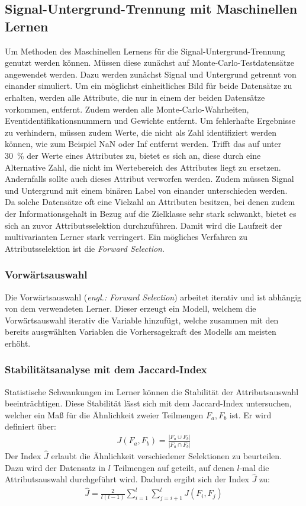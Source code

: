 \subsection{Signal-Untergrund-Trennung mit Maschinellen Lernen}
\label{Signal}
Um Methoden des Maschinellen Lernens für die Signal-Untergrund-Trennung genutzt werden können. Müssen diese zunächst auf Monte-Carlo-Testdatensätze angewendet werden. Dazu werden zunächst Signal und Untergrund getrennt von einander simuliert. Um ein möglichst einheitliches Bild für beide Datensätze zu erhalten, werden alle Attribute, die nur in einem der beiden Datensätze vorkommen, entfernt. Zudem werden alle Monte-Carlo-Wahrheiten, Eventidentifikationsnummern und Gewichte entfernt. Um fehlerhafte Ergebnisse zu verhindern, müssen zudem Werte, die nicht als Zahl identifiziert werden können, wie zum Beispiel NaN oder Inf entfernt werden. Trifft das auf unter \SI{30}{\percent} der Werte eines Attributes zu, bietet es sich an, diese durch eine Alternative Zahl, die nicht im Wertebereich des Attributes liegt zu ersetzen. Andernfalls sollte auch dieses Attribut verworfen werden. Zudem müssen Signal und Untergrund mit einem binären Label von einander unterschieden werden.\\
Da solche Datensätze oft eine Vielzahl an Attributen besitzen, bei denen zudem der Informationsgehalt in Bezug auf die Zielklasse sehr stark schwankt, bietet es sich an zuvor Attributsselektion durchzuführen. Damit wird die Laufzeit der multivarianten Lerner stark verringert. Ein mögliches Verfahren zu Attributsselektion ist die \textit{Forward Selection}.
\subsubsection{Vorwärtsauswahl}
Die Vorwärtsauswahl (\textit{engl.: Forward Selection}) arbeitet iterativ und ist abhängig von dem verwendeten Lerner. Dieser erzeugt ein Modell, welchem die Vorwärtsauswahl iterativ die Variable hinzufügt, welche zusammen mit den bereits ausgwählten Variablen die Vorhersagekraft des Modells am meisten erhöht.
\subsubsection{Stabilitätsanalyse mit dem Jaccard-Index}
Statistische Schwankungen im Lerner können die Stabilität der Attributsauswahl beeinträchtigen. Diese Stabilität lässt sich mit dem Jaccard-Index untersuchen, welcher ein Maß für die Ähnlichkeit zweier Teilmengen $F_{a},F_{b}$ ist. Er wird definiert über:
\begin{align}
	J(F_{a},F_{b}) = \frac{|F_{a} \cup F_{b}|}{|F_{a} \cap F_{b}|}
\end{align}
Der Index $\hat{J}$ erlaubt die Ähnlichkeit verschiedener Selektionen zu beurteilen. Dazu wird der Datensatz in $l$ Teilmengen auf geteilt, auf denen $l$-mal die Attributsauswahl durchgeführt wird. Dadurch ergibt sich der Index $\hat{J}$ zu:
\begin{align}
	\hat{J} = \frac{2}{l(l-1)} \sum^{l}_{i=1} \sum^{l}_{j=i+1} J(F_{i},F_{j})
\end{align}

